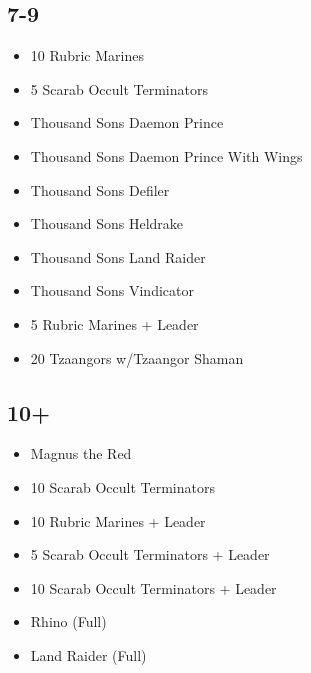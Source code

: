 \documentclass{HordeModeTarot}
\begin{document}
\begin{multicols}{2}
\subsection*{7-9}

\begin{itemize}[leftmargin=*]
\item[] 10 Rubric Marines
\item[] 5 Scarab Occult Terminators
\item[] Thousand Sons Daemon Prince
\item[] Thousand Sons Daemon Prince With Wings
\item[] Thousand Sons Defiler
\item[] Thousand Sons Heldrake
\item[] Thousand Sons Land Raider
\item[] Thousand Sons Vindicator
\item[] 5 Rubric Marines + Leader
\item[] 20 Tzaangors w/Tzaangor Shaman
\end{itemize}

\subsection*{10+}

\begin{itemize}[leftmargin=*]
\item[] Magnus the Red
\item[] 10 Scarab Occult Terminators
\item[] 10 Rubric Marines + Leader
\item[] 5 Scarab Occult Terminators + Leader
\item[] 10 Scarab Occult Terminators + Leader
\item[] Rhino (Full)
\item[] Land Raider (Full)
\end{itemize}


\end{multicols}
\end{document}
